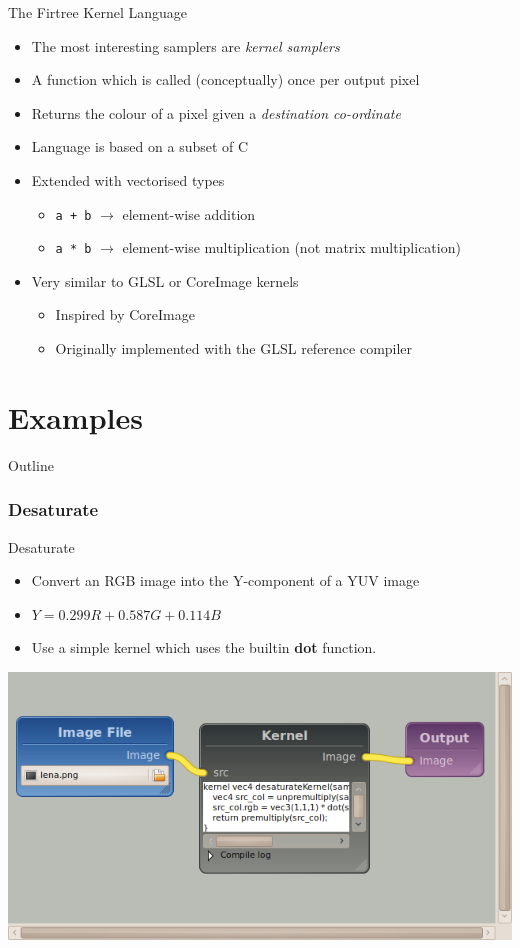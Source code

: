 \documentclass{beamer}
\newcommand{\fancypart}[1]{%
  \part{#1}
  \begin{frame}
    \partpage
  \end{frame}
  \begin{frame}{Outline}
    \tableofcontents
  \end{frame}
}
\newcommand{\bi}{\begin{itemize}}
\newcommand{\ei}{\end{itemize}}
\begin{document}
\begin{frame}{The Firtree Kernel Language}
  \bi
    \item The most interesting samplers are \emph{kernel samplers}
    \item A function which is called (conceptually) once per output pixel
    \item Returns the colour of a pixel given a \emph{destination co-ordinate}
    \item Language is based on a subset of C
    \item Extended with vectorised types
    \bi
      \item \texttt{a + b} $\rightarrow$ element-wise addition
      \item \texttt{a * b} $\rightarrow$ element-wise multiplication (not matrix
      multiplication)
    \ei
    \item Very similar to GLSL or CoreImage kernels
    \bi
      \item Inspired by CoreImage
      \item Originally implemented with the GLSL reference compiler
    \ei
  \ei
\end{frame}


\fancypart{Examples}

\section{Desaturate} %

\begin{frame}{Desaturate}
  \bi
    \item Convert an RGB image into the Y-component of a YUV image
    \item $Y = 0.299R + 0.587G + 0.114B$
    \item Use a simple kernel which uses the builtin \textbf{dot} function.
  \ei
\end{frame}

\begin{frame}
\includegraphics[width=\textwidth]{desat-pipeline}
\end{frame}
\end{document}
